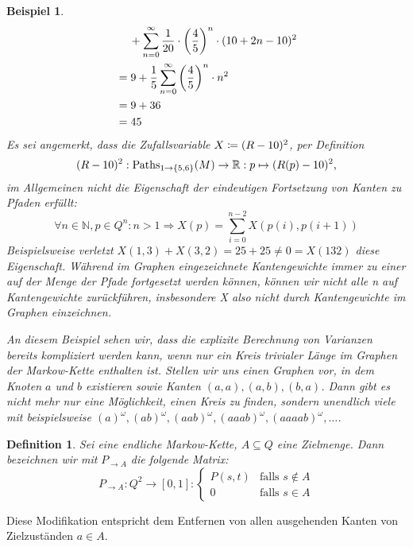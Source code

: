 \documentclass[a4paper]{article}
\newcommand{\mc}{Markow-Kette}
\newtheorem{beispiel}[satz]{Beispiel}
\newtheorem{definition}[satz]{Definition} %
\theoremstyle{nonumberplain}
\begin{document}
\begin{beispiel}
\begin{align*}
		& \hspace{1.2em} + \sum_{n = 0}^{\infty}{\frac{1}{20}\cdot\left(\frac{4}{5}\right)^n \cdot (10 + 2n - 10)^2} \\
		& = 9 + \frac{1}{5}\sum_{n = 0}^{\infty}{\left(\frac{4}{5}\right)^n \cdot n^2} \\
		& = 9 + 36 \\
		& = 45
		\end{align*}
		Es sei angemerkt, dass die Zufallsvariable $X \coloneqq (R-10)^2$, per Definition
		\[
		(R-10)^2 : \mathrm{Paths}_{1 \rightarrow \{5,6\}}(M) \to  \mathbb{R} : p \mapsto (R(p) - 10)^2\text{,}
		\]
		im Allgemeinen nicht die Eigenschaft der eindeutigen Fortsetzung von Kanten zu Pfaden erfüllt:
		\[
		\forall n \in \mathbb{N}, p \in Q^n : n>1 \Rightarrow X(p) = \sum_{i=0}^{n-2}{X(p(i),p(i+1))}
		\]
		Beispielsweise verletzt $X(1,3) + X(3,2) = 25 + 25 \neq 0 = X(132)$ diese Eigenschaft. Während im Graphen eingezeichnete Kantengewichte immer zu einer \rvar{} auf der Menge der Pfade fortgesetzt werden können, können wir nicht alle \rvar{}n auf Kantengewichte zurückführen, insbesondere X also nicht durch Kantengewichte im Graphen einzeichnen.
		
		
		An diesem Beispiel sehen wir, dass die explizite Berechnung von Varianzen bereits kompliziert werden kann, wenn nur ein Kreis trivialer Länge im Graphen der \mc{} enthalten ist. Stellen wir uns einen Graphen vor, in dem Knoten $a$ und $b$ existieren sowie Kanten $(a,a), (a,b), (b,a)$. Dann gibt es nicht mehr nur eine Möglichkeit, einen Kreis zu finden, sondern unendlich viele mit beispielsweise $(a)^\omega, (ab)^\omega, (aab)^\omega, (aaab)^\omega, (aaaab)^\omega,\dots$\;.
	\end{beispiel}
	
	\begin{definition}\label{def-pmod}
		Sei \mcex{} eine endliche \mc, $A\subseteq Q$ eine Zielmenge. Dann bezeichnen wir mit $P_{\rightarrow A}$ die folgende Matrix:
		\begin{equation}
		P_{\rightarrow A} : Q^2 \to [0,1] : \begin{cases}
		P(s,t) & \text{falls } s\notin A\\
		0 & \text{falls } s\in A
		\end{cases}
		\end{equation}
	\end{definition}
	
	Diese Modifikation entspricht dem Entfernen von allen ausgehenden Kanten von Zielzuständen $a\in A$.
	
\end{document}
